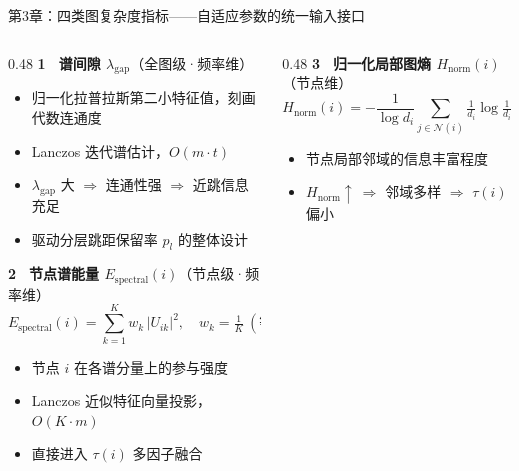 \documentclass[aspectratio=169,9pt,xcolor=dvipsnames]{beamer}
\newcommand{\blue}[1]{\textcolor{mynavy}{#1}}
\begin{document}
\begin{frame}{第3章：四类图复杂度指标——自适应参数的统一输入接口}
  \begin{columns}[T]
    \begin{column}{0.48\textwidth}
      \textbf{\blue{1 \, 谱间隙 $\lambda_{\mathrm{gap}}$}}（全图级·频率维）
      \begin{itemize}
        \item 归一化拉普拉斯第二小特征值，刻画代数连通度
        \item Lanczos 迭代谱估计，$O(m\cdot t)$
        \item $\lambda_{\mathrm{gap}}$ 大 $\Rightarrow$ 连通性强 $\Rightarrow$ 近跳信息充足
        \item 驱动分层跳距保留率 $p_l$ 的整体设计
      \end{itemize}

      \vspace{0.2cm}
      \textbf{\blue{2 \, 节点谱能量 $E_{\mathrm{spectral}}(i)$}}（节点级·频率维）
      \begin{equation*}
        E_{\mathrm{spectral}}(i) = \sum_{k=1}^{K}w_k\,|U_{ik}|^2,\quad
        w_k=\tfrac{1}{K}\ (\text{等权})
      \end{equation*}
      \begin{itemize}
        \item 节点 $i$ 在各谱分量上的参与强度
        \item Lanczos 近似特征向量投影，$O(K\cdot m)$
        \item 直接进入 $\tau(i)$ 多因子融合
      \end{itemize}
    \end{column}

    \begin{column}{0.48\textwidth}
      \textbf{\blue{3 \, 归一化局部图熵 $H_{\mathrm{norm}}(i)$}}（节点维）
      \begin{equation*}
        H_{\mathrm{norm}}(i)
        =-\frac{1}{\log d_i}\sum_{j\in\mathcal{N}(i)}\tfrac{1}{d_i}\log\tfrac{1}{d_i}
      \end{equation*}
      \begin{itemize}
        \item 节点局部邻域的信息丰富程度
        \item $H_{\mathrm{norm}}\uparrow\ \Rightarrow$ 邻域多样 $\Rightarrow$ $\tau(i)$ 偏小
      \end{itemize}


\end{column}
\end{columns}
\end{frame}
\end{document}
